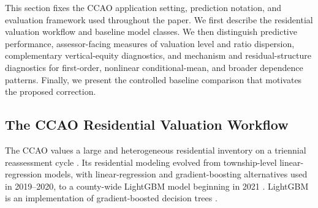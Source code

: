 \documentclass[10pt]{article}
\theoremstyle{definition}
\newcommand{\1}{\mathbf{1}}
\newcommand{\oldtext}[1]{\textcolor{blue}{\sout{#1}}}
\newcommand{\newtext}[1]{\textcolor{impGreen}{#1}}
\begin{document}


\newtext{This section fixes the CCAO application setting, prediction notation, and evaluation framework used throughout the paper. We first describe the residential valuation workflow and baseline model classes. We then distinguish predictive performance, assessor-facing measures of valuation level and ratio dispersion, complementary vertical-equity diagnostics, and mechanism and residual-structure diagnostics for first-order, nonlinear conditional-mean, and broader dependence patterns. Finally, we present the controlled baseline comparison that motivates the proposed correction.}


\subsection{The CCAO Residential Valuation Workflow}
\label{subsec:ccao_workflow}

The CCAO values a large and heterogeneous residential inventory on a triennial reassessment cycle \cite{CCAOAssessmentCalendar2026}. Its residential modeling evolved from township-level linear-regression models, with linear-regression and gradient-boosting alternatives used in 2019--2020, to a county-wide LightGBM model beginning in 2021 \cite{CCAOModelResAVM2026}. LightGBM is an implementation of gradient-boosted decision trees \cite{lightgbm}.
\end{document}
